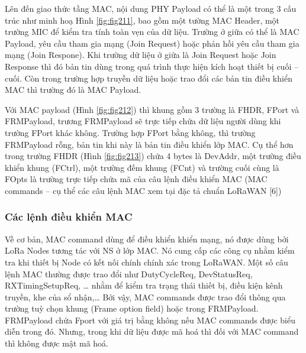 	Lên đến giao thức tầng MAC, nội dung PHY Payload có thể là một trong 3 cấu trúc như minh hoạ Hình \ref{fig:fig211}, bao gồm một tường MAC Header, một trường MIC để kiểm tra tính toàn vẹn của dữ liệu. Trường ở giữa có thể là MAC Payload, yêu cầu tham gia mạng (Join Request) hoặc phản hồi yêu cầu tham gia mạng (Join Respone). Khi trường dữ liệu ở giữa là Join Request hoặc Join Response thì đó bản tin dùng trong quá trình thực hiện kích hoạt thiết bị cuối – cuối. Còn trong trường hợp truyền dữ liệu hoặc trao đổi các bản tin điều khiển MAC thì trường đó là MAC Payload.  \par 
	Với MAC payload (Hình \ref{fig:fig212}) thì khung gồm 3 trường là FHDR, FPort và FRMPayload, trương FRMPayload sẽ trực tiếp chứa dữ liệu người dùng khi trường FPort khác không. Trường hợp FPort bằng không, thì trường FRMPayload rỗng, bản tin khi này là bản tin điều khiển lớp MAC. Cụ thể hơn trong trường FHDR (Hình \ref{fig:fig213}) chứa 4 bytes là DevAddr, một trường điều khiển khung (FCtrl), một trường đếm khung (FCnt) và trường cuối cùng là FOpts là trường trực tiếp chứa mã của câu lệnh điều khiển MAC (MAC commands – cụ thể các câu lệnh MAC xem tại đặc tả chuẩn LoRaWAN [6]) 

\subsubsection{Các lệnh điều khiển MAC}

Về cơ bản, MAC command dùng để điều khiển khiển mạng, nó được dùng bởi LoRa Nodes tương tác với NS ở lớp MAC. Nó cung cấp các công cụ nhằm kiểm tra khi thiết bị Node có kết nối chính chính xác trong LoRaWAN. Một số câu lệnh MAC thường được trao đổi như DutyCycleReq, DevStatusReq, RXTimingSetupReq, … nhằm để kiểm tra trạng thái thiết bị, điều kiện kênh truyền, khe của sổ nhận,… Bởi vậy, MAC commands được trao đổi thông qua trường tuỳ chọn khung (Frame option field) hoặc trong FRMPayload. FRMPayload chứa Fport với giá trị bằng không nếu MAC commands được biểu diễn trong đó. Nhưng, trong khi dữ liệu được mã hoá thì đối với MAC command thì không được mật mã hoá. 
